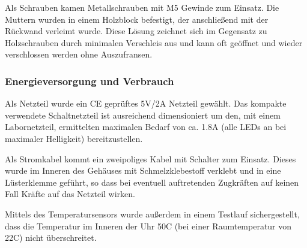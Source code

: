 Als Schrauben kamen Metallschrauben mit M5 %
Gewinde zum Einsatz. Die Muttern wurden in einem Holzblock befestigt, der anschließend mit der Rückwand verleimt wurde.%
Diese Lösung zeichnet sich im Gegensatz zu Holzschrauben durch minimalen Verschleis aus und kann oft geöffnet und wieder verschlossen werden ohne Auszufransen.

\subsubsection{Energieversorgung und Verbrauch}
Als Netzteil wurde ein CE geprüftes 5V/2A Netzteil gewählt. Das kompakte verwendete Schaltnetzteil ist ausreichend dimensioniert um den, mit einem Labornetzteil, ermittelten maximalen Bedarf von ca. 1.8A%
(alle LEDs an bei maximaler Helligkeit) bereitzustellen.
 
Als Stromkabel kommt ein zweipoliges Kabel mit Schalter zum Einsatz. Dieses wurde im Inneren des Gehäuses mit Schmelzklebestoff verklebt und in eine Lüsterklemme geführt, so dass bei eventuell auftretenden Zugkräften auf keinen Fall Kräfte auf das Netzteil wirken.

Mittels des Temperatursensors wurde außerdem in einem Testlauf sichergestellt, dass die Temperatur im Inneren der Uhr 50\degree C (bei einer Raumtemperatur von 22\degree C) nicht überschreitet.
